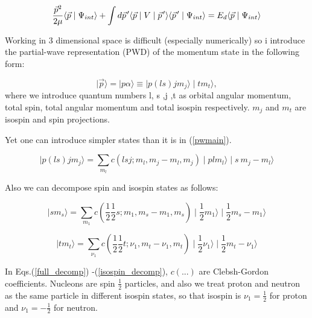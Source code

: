     \begin{equation}
        \frac{\vec{p}^2}{2\mu} \langle \vec{p} \mid \Psi_{int} \rangle +
        \int d \pvec{p} \langle \vec{p} \mid V \mid \pvec{p} \rangle
        \langle \pvec{p} \mid \Psi_{int} \rangle = 
        E_d \langle \vec{p} \mid \Psi_{int} \rangle
        \label{shrod_old}
    \end{equation}

    Working in 3 dimensional space  is difficult (especially numerically)
    so i introduce the partial-wave representation (PWD) of the momentum state in the following form:

    \begin{equation}
        \mid \vec{p} \rangle = \mid p \alpha \rangle \equiv \mid p (ls) j m_j \rangle \mid t m_t \rangle,
        \label{pwmain}
    \end{equation}
    where we introduce quantum numbers l, s ,j ,t as orbital angular momentum, total spin,
    total angular momentum and total isospin respectively. $m_j$ and $m_t$ are isospin
    and spin projections.


    Yet one can introduce simpler states than it is in (\ref{pwmain}).
    
    \begin{equation}
        \mid p (ls) j m_j \rangle = \sum_{m_l} c(lsj;m_l, m_j\!-\!m_l, m_j) \mid p l m_l \rangle
        \mid s~m_j\!-\!m_l \rangle
        \label{full_decomp}
    \end{equation}

    Also we can decompose spin and isospin states as follows:

    \begin{equation}
        \mid s m_s \rangle = \sum_{m_1} c(\frac{1}{2}\frac{1}{2}s;m_1, m_s\!-\!m_1, m_s)
        \mid \frac{1}{2} m_1 \rangle
        \mid \frac{1}{2} m_s\!-\!m_1 \rangle
        \label{spin_decomp}
    \end{equation}

    \begin{equation}
        \mid t m_t \rangle = \sum_{\nu_1} c(\frac{1}{2}\frac{1}{2}t;\nu_1, m_t\!-\!\nu_1, m_t)
        \mid \frac{1}{2} \nu_1 \rangle
        \mid \frac{1}{2} m_t\!-\!\nu_1 \rangle
        \label{isospin_decomp}
    \end{equation}

    In Eqs.(\ref{full_decomp}) -(\ref{isospin_decomp}),  $c(...)$ are Clebsh-Gordon coefficients.
    Nucleons are spin $\frac{1}{2}$ particles, and also we treat proton and neutron as 
    the same particle in different 
    isospin states, so that isospin is $\nu_1 = \frac{1}{2}$ for proton and $\nu_1 = -\frac{1}{2}$ for neutron.

